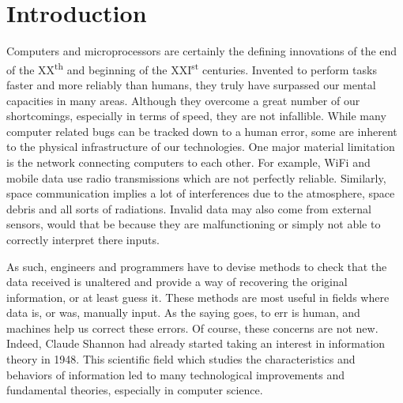 \chapter{Introduction}
\label{chap:intro}


Computers and microprocessors are certainly the defining innovations of the end of the XX\textsuperscript{th} and beginning of the XXI\textsuperscript{st} centuries.
Invented to perform tasks faster and more reliably than humans, they truly have surpassed our mental capacities in many areas.
Although they overcome a great number of our shortcomings, especially in terms of speed, they are not infallible.
While many computer related bugs can be tracked down to a human error, some are inherent to the physical infrastructure of our technologies.
One major material limitation is the network connecting computers to each other.
For example, WiFi and mobile data use radio transmissions which are not perfectly reliable. Similarly, space communication implies a lot of interferences due to the atmosphere, space debris and all sorts of radiations.
Invalid data may also come from external sensors, would that be because they are malfunctioning or simply not able to correctly interpret there inputs.

As such, engineers and programmers have to devise methods to check that the data received is unaltered and provide a way of recovering the original information, or at least guess it.
These methods are most useful in fields where data is, or was, manually input.
As the saying goes, to err is human, and machines help us correct these errors.
Of course, these concerns are not new. Indeed, Claude Shannon had already started taking an interest in information theory in 1948\cite{information_theory}.
This scientific field which studies the characteristics and behaviors of information led to many technological improvements and fundamental theories, especially in computer science.

